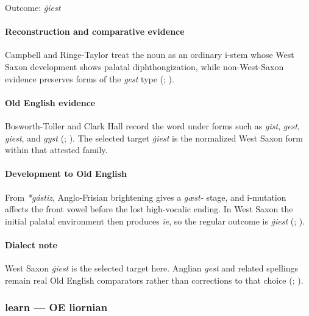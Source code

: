 \documentclass[
  british,
  a4paper,
]{article}
\begin{document}
Outcome: \emph{ġiest}

\paragraph{Reconstruction and comparative
evidence}\label{reconstruction-and-comparative-evidence-6}

Campbell and Ringe-Taylor treat the noun as an ordinary i-stem whose
West Saxon development shows palatal diphthongization, while
non-West-Saxon evidence preserves forms of the \emph{gest} type
(;
).

\paragraph{Old English evidence}\label{old-english-evidence-6}

Bosworth-Toller and Clark Hall record the word under forms such as
\emph{gist}, \emph{gest}, \emph{giest}, and \emph{gyst}
(;
). The selected target
\emph{ġiest} is the normalized West Saxon form within that attested
family.

\paragraph{Development to Old
English}\label{development-to-old-english-6}

From \emph{*gástiz}, Anglo-Frisian brightening gives a \emph{gæst-}
stage, and i-mutation affects the front vowel before the lost
high-vocalic ending. In West Saxon the initial palatal environment then
produces \emph{ie}, so the regular outcome is \emph{ġiest}
(;
).

\paragraph{Dialect note}\label{dialect-note}

West Saxon \emph{ġiest} is the selected target here. Anglian \emph{gest}
and related spellings remain real Old English comparators rather than
corrections to that choice (; ).

\subsubsection{learn --- OE liornian}\label{learn-oe-liornian}
\end{document}
